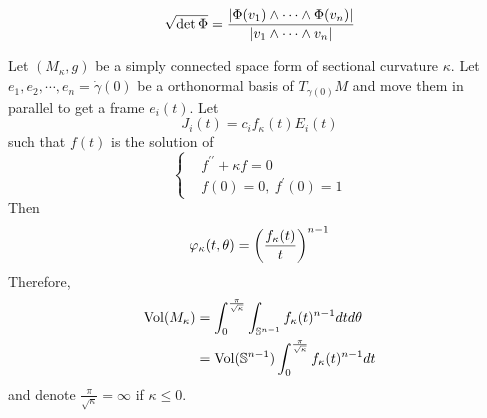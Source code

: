 \begin{enumerate}[label=\arabic{*}]
\begin{rmk}
		\begin{equation*}
			\sqrt{\det \Phi} = \frac{\left\lvert\Phi(v_1)\wedge \cdots\wedge \Phi(v_n)\right\lvert}{\left\lvert v_1\wedge \cdots \wedge v_n\right\lvert}
		\end{equation*}
	\end{rmk}
	\begin{exam}
		Let $(M_\kappa,g)$ be a simply connected space form of sectional curvature $\kappa$. Let $e_1,e_2,\cdots,e_n=\dot{\gamma}(0)$ be a orthonormal basis of $T_{\gamma(0)}M$ and move them in parallel to get a frame $e_i(t)$. Let
		\begin{equation*}
			J_i(t) = c_if_\kappa(t)E_i(t)
		\end{equation*}
		such that $f(t)$ is the solution of
		\begin{equation*}
			\left\{
				\begin{aligned}
					&f^{\prime\prime} + \kappa f = 0\\
					&f(0)=0,~f^\prime(0)=1
				\end{aligned}
			\right.
		\end{equation*}
		Then
		\begin{equation*}
			\varphi_\kappa(t,\theta) = \left(\frac{f_\kappa(t)}{t}\right)^{n-1}
		\end{equation*}
		Therefore,
		\begin{equation*}
			\begin{aligned}
				\operatorname{Vol}(M_\kappa) &= \int_0^{\frac{\pi}{\sqrt{\kappa}}} \int_{\mathbb{S}^{n-1}}f_\kappa(t)^{n-1}dtd\theta \\
				&= \operatorname{Vol}(\mathbb{S}^{n-1})\int_0^{\frac{\pi}{\sqrt{\kappa}}}f_\kappa(t)^{n-1}dt
			\end{aligned}
		\end{equation*}
		and denote $\frac{\pi}{\sqrt{\kappa}} = \infty$ if $\kappa \leq 0$.
	\end{exam}


\end{enumerate}
